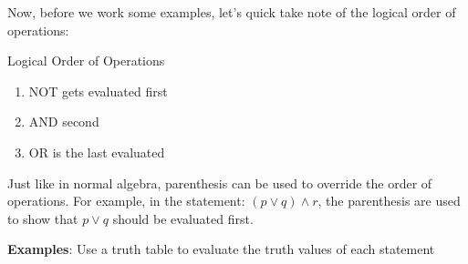 Now, before we work some examples, let's quick take note of the logical order of operations:

\begin{note}{Logical Order of Operations}{}
  \begin{enumerate}
    \item NOT gets evaluated first 
    \item AND second 
    \item OR is the last evaluated
  \end{enumerate}
  Just like in normal algebra, parenthesis can be used to override the order of operations. For example, in the statement: $(p \lor q) \land r$, the parenthesis are used to show that $p \lor q$ should be evaluated first.
\end{note}

\textbf{Examples}: Use a truth table to evaluate the truth values of each statement
